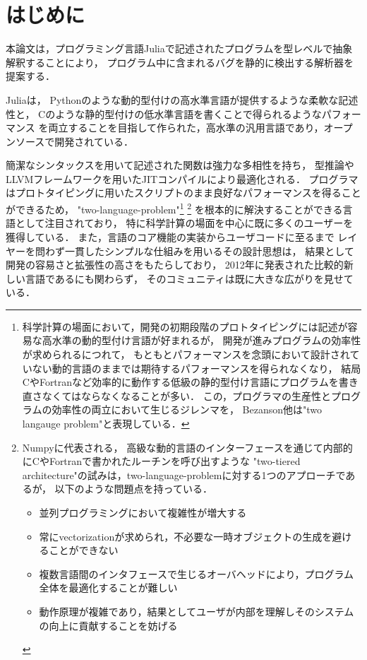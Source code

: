 
\section{はじめに}

本論文は，プログラミング言語Juliaで記述されたプログラムを型レベルで抽象解釈することにより，
プログラム中に含まれるバグを静的に検出する解析器を提案する．

Julia\cite{julia}は，
Pythonのような動的型付けの高水準言語が提供するような柔軟な記述性と，
Cのような静的型付けの低水準言語を書くことで得られるようなパフォーマンス
を両立することを目指して作られた，高水準の汎用言語であり，オープンソースで開発されている．

簡潔なシンタックスを用いて記述された関数は強力な多相性を持ち，
型推論やLLVMフレームワークを用いたJITコンパイルにより最適化される．
プログラマはプロトタイピングに用いたスクリプトのまま良好なパフォーマンスを得ることができるため，
"two-language-problem"\footnote{
  科学計算の場面において，開発の初期段階のプロトタイピングには記述が容易な高水準の動的型付け言語が好まれるが，
  開発が進みプログラムの効率性が求められるにつれて，
  もともとパフォーマンスを念頭において設計されていない動的言語のままでは期待するパフォーマンスを得られなくなり，
  結局CやFortranなど効率的に動作する低級の静的型付け言語にプログラムを書き直さなくてはならなくなることが多い．
  この，プログラマの生産性とプログラムの効率性の両立において生じるジレンマを，
  Bezanson他は"two langauge problem"\cite{julia-2012, Julia-2017}と表現している．
} \footnote{
  Numpy\cite{numpy}に代表される，
  高級な動的言語のインターフェースを通じて内部的にCやFortranで書かれたルーチンを呼び出すような
  "two-tiered architecture"の試みは，two-language-problemに対する1つのアプローチであるが，
  以下のような問題点を持っている\cite{julia-2012}．
  \begin{itemize}
    \item 並列プログラミングにおいて複雑性が増大する
    \item 常にvectorizationが求められ，不必要な一時オブジェクトの生成を避けることができない
    \item 複数言語間のインタフェースで生じるオーバヘッドにより，プログラム全体を最適化することが難しい
    \item 動作原理が複雑であり，結果としてユーザが内部を理解しそのシステムの向上に貢献することを妨げる
  \end{itemize}
} を根本的に解決することができる言語として注目されており，
特に科学計算の場面を中心に既に多くのユーザーを獲得している\cite{julia-growth}．
また，言語のコア機能の実装からユーザコードに至るまで
レイヤーを問わず一貫したシンプルな仕組みを用いるその設計思想は，
結果として開発の容易さと拡張性の高さをもたらしており\cite{julia-2012}，
2012年に発表された比較的新しい言語であるにも関わらず，
そのコミュニティは既に大きな広がりを見せている．

